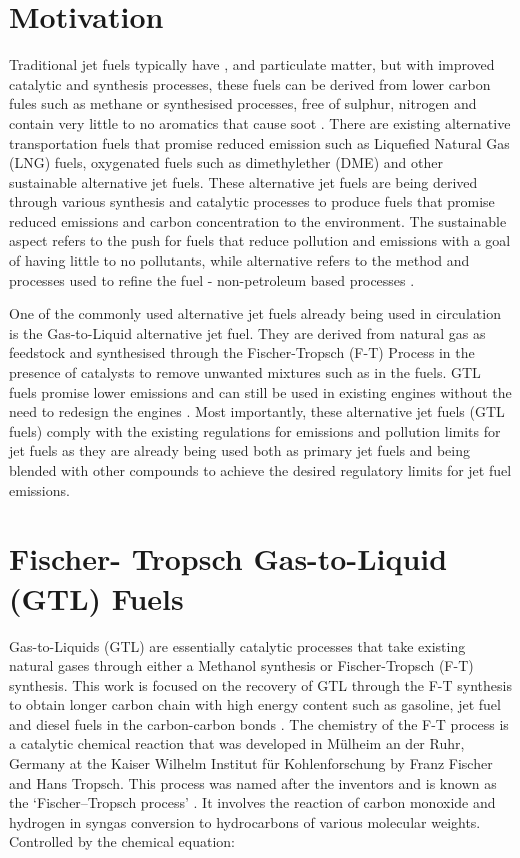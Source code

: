\section{Motivation}
Traditional jet fuels typically have ,  and particulate matter, but with improved catalytic and synthesis processes, these fuels can be derived from lower carbon fules such as methane or synthesised processes, free of sulphur, nitrogen and contain very little to no aromatics that cause soot \cite{Boogaard2017ToxicologicalToxicology}. There are existing alternative transportation fuels that promise reduced emission such as Liquefied Natural Gas (LNG) fuels, oxygenated fuels such as dimethylether (DME) and other sustainable alternative jet fuels. These alternative jet fuels are being derived through various synthesis and catalytic processes to produce fuels that promise reduced emissions and carbon concentration to the environment\cite{Whale2018ToxicologicalEcotoxicology}. The sustainable aspect refers to the push for fuels that reduce pollution and emissions with a goal of having little to no pollutants, while alternative refers to the method and processes used to refine the fuel - non-petroleum based processes \cite{NationalsAcademiesofSciences2016CommercialResearch}. 

One of the commonly used alternative jet fuels already being used in circulation is the Gas-to-Liquid alternative jet fuel. They are derived from natural gas as feedstock and synthesised through the Fischer-Tropsch (F-T) \cite{Speight2014ChapterProcess} Process in the presence of catalysts to remove unwanted mixtures such as  in the fuels. GTL fuels promise lower  emissions and can still be used in existing engines without the need to redesign the engines \cite{Corporan2007EmissionsFuel}. Most importantly, these alternative jet fuels (GTL fuels) comply with the existing regulations for emissions and pollution limits for jet fuels as they are already being used both as primary jet fuels and being blended with other compounds to achieve the desired regulatory limits for jet fuel emissions. 
\cleardoublepage
\section{Fischer- Tropsch Gas-to-Liquid (GTL) Fuels}
Gas-to-Liquids (GTL) are essentially catalytic processes that take existing natural gases through either a Methanol synthesis or Fischer-Tropsch (F-T) synthesis. This work is focused on the recovery of GTL through the F-T synthesis to obtain longer carbon chain with high energy content such as gasoline, jet fuel and diesel fuels in the carbon-carbon bonds \cite{U.S.EIA}. The chemistry of the F-T process is a catalytic chemical reaction that was developed in Mülheim an der Ruhr, Germany at the Kaiser Wilhelm Institut für Kohlenforschung by Franz Fischer and Hans Tropsch. This process was named after the inventors and is known as the ‘Fischer–Tropsch process’ \cite{Boogaard2017ToxicologicalToxicology}.
It involves the reaction of carbon monoxide  and hydrogen  in syngas conversion to hydrocarbons of various molecular weights. Controlled by the chemical equation:

